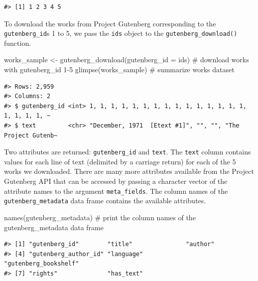 \documentclass[
  letterpaper,
]{latex/krantz}
\newenvironment{Shaded}{\begin{snugshade}}{\end{snugshade}}
\newcommand{\AttributeTok}[1]{\textcolor[rgb]{0.40,0.45,0.13}{#1}}
\newcommand{\CommentTok}[1]{\textcolor[rgb]{0.37,0.37,0.37}{#1}}
\newcommand{\FunctionTok}[1]{\textcolor[rgb]{0.28,0.35,0.67}{#1}}
\newcommand{\NormalTok}[1]{\textcolor[rgb]{0.00,0.23,0.31}{#1}}
\newcommand{\OtherTok}[1]{\textcolor[rgb]{0.00,0.23,0.31}{#1}}
\begin{document}
\begin{verbatim}
#> [1] 1 2 3 4 5
\end{verbatim}

To download the works from Project Gutenberg corresponding to the
\texttt{gutenberg\_id}s 1 to 5, we pass the \texttt{ids} object to the
\texttt{gutenberg\_download()} function.

\begin{Shaded}
\begin{Highlighting}[]
\NormalTok{works\_sample }\OtherTok{\textless{}{-}} \FunctionTok{gutenberg\_download}\NormalTok{(}\AttributeTok{gutenberg\_id =}\NormalTok{ ids) }\CommentTok{\# download works with \textasciigrave{}gutenberg\_id\textasciigrave{} 1{-}5}
\FunctionTok{glimpse}\NormalTok{(works\_sample) }\CommentTok{\# summarize \textasciigrave{}works\textasciigrave{} dataset}
\end{Highlighting}
\end{Shaded}

\begin{verbatim}
#> Rows: 2,959
#> Columns: 2
#> $ gutenberg_id <int> 1, 1, 1, 1, 1, 1, 1, 1, 1, 1, 1, 1, 1, 1, 1, 1, 1, 1, 1, ~
#> $ text         <chr> "December, 1971  [Etext #1]", "", "", "The Project Gutenb~
\end{verbatim}

Two attributes are returned: \texttt{gutenberg\_id} and \texttt{text}.
The \texttt{text} column contains values for each line of text
(delimited by a carriage return) for each of the 5 works we downloaded.
There are many more attributes available from the Project Gutenberg API
that can be accessed by passing a character vector of the attribute
names to the argument \texttt{meta\_fields}. The column names of the
\texttt{gutenberg\_metadata} data frame contains the available
attributes.

\begin{Shaded}
\begin{Highlighting}[]
\FunctionTok{names}\NormalTok{(gutenberg\_metadata) }\CommentTok{\# print the column names of the \textasciigrave{}gutenberg\_metadata\textasciigrave{} data frame}
\end{Highlighting}
\end{Shaded}

\begin{verbatim}
#> [1] "gutenberg_id"        "title"               "author"             
#> [4] "gutenberg_author_id" "language"            "gutenberg_bookshelf"
#> [7] "rights"              "has_text"
\end{verbatim}
\end{document}
